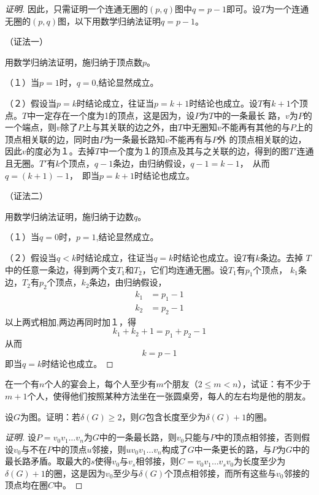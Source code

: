 \documentclass{article}
\begin{document}
\begin{CJK}{UTF8}{gbsn}
\begin{proof}[证明]
    因此，只需证明一个连通无圈的$(p,q)$图中$q=p-1$即可。设$T$为一个连通无圈的$(p,q)$图，以下用数学归纳法证明$q=p-1$。

    
  （证法一）
  
    用数学归纳法证明，施归纳于顶点数$p$。
    
    （１）当$p=1$时，$q=0$,结论显然成立。

    （２）假设当$p=k$时结论成立，往证当$p=k+1$时结论也成立。设$T$有$k+1$个顶点。$T$中一定存在一个度为1的顶点，这是因为，设$P$为$T$中的一条最长
    路，$v$为$P$的一个端点，则$v$除了$P$上与其关联的边之外，由$T$中无圈知$v$不能再有其他的与$P$上的顶点相关联的边，同时由$P$为一条最长路知$v$不能再有与$P$外
    的顶点相关联的边，因此$v$的度必为１。去掉$T$中一个度为１的顶点及其与之关联的边，得到的图$T'$连通且无圈。$T'$有$k$个顶点，$q-1$条边，由归纳假设，$q-1 = k - 1$，　从而$q = (k +1) - 1$，　即当$p=k+1$时结论也成立。

    （证法二）
    
      用数学归纳法证明，施归纳于边数$q$。
    
    （１）当$q=0$时，$p=1$,结论显然成立。

    （２）假设当$q<k$时结论成立，往证当$q=k$时结论也成立。设$T$有$k$条边。去掉
    $T$中的任意一条边，得到两个支$T_1$和$T_2$，它们均连通无圈。设$T_1$有$p_1$个顶点，
    $k_1$条边，$T_2$有$p_2$个顶点，$k_2$条边，由归纳假设，
    \begin{equation*}
      \begin{split}
        k_1 &= p_1 - 1\\
        k_2 &= p_2 - 1
      \end{split}
    \end{equation*}
    以上两式相加,两边再同时加１，得
    \[k_1 + k_2  + 1 = p_1 + p_2 - 1\]
    从而
    \[k = p - 1 \]
    即当$q=k$时结论也成立。
\end{proof}

\begin{Exercise}
  在一个有$n$个人的宴会上，每个人至少有$m$个朋友（$2\leq m < n$），试证：有不少于$m+1$个人，使得他们按照某种方法坐在一张圆桌旁，每人的左右均是他的朋友。
\end{Exercise}
  \begin{Exercise}
  设$G$为图。证明：若$\delta(G)\geq 2$，则$G$包含长度至少为$\delta(G)+1$的圈。  
  \end{Exercise}
  \begin{proof}[证明]
    设$P=v_0v_1\ldots v_n$为$G$中的一条最长路，则$v_0$只能与$P$中的顶点相邻接，否则假设$v_0$与不在$P$中的顶点$u$邻接，则$uv_0v_1\ldots v_n$构成了$G$中一条更长的路，与$P$为$G$中的最长路矛盾。取最大的$s$使得$v_0$与$v_s$相邻接，则$C=v_0v_1\ldots v_sv_0$为长度至少为$\delta(G)+1$的圈，这是因为$v_0$至少与$\delta(G)$个顶点相邻接，而所有这些与$v_0$邻接的顶点均在圈$C$中。
  \end{proof}


\end{CJK}
\end{document}
